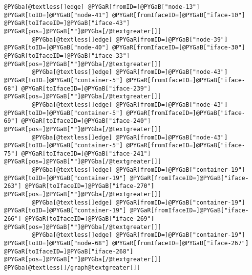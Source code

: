 \documentclass[a4wide,10pt,italian]{manual}
\begin{document}
\begin{Verbatim}[commandchars=@\[\]]
        @PYGba[@textless[]edge] @PYGaR[fromID=]@PYGaB["node-13"] @PYGaR[toID=]@PYGaB["node-41"] @PYGaR[fromIfaceID=]@PYGaB["iface-10"] @PYGaR[toIfaceID=]@PYGaB["iface-43"] @PYGaR[pos=]@PYGaB[""]@PYGba[/@textgreater[]]
        @PYGba[@textless[]edge] @PYGaR[fromID=]@PYGaB["node-39"] @PYGaR[toID=]@PYGaB["node-40"] @PYGaR[fromIfaceID=]@PYGaB["iface-30"] @PYGaR[toIfaceID=]@PYGaB["iface-33"] @PYGaR[pos=]@PYGaB[""]@PYGba[/@textgreater[]]
        @PYGba[@textless[]edge] @PYGaR[fromID=]@PYGaB["node-43"] @PYGaR[toID=]@PYGaB["container-5"] @PYGaR[fromIfaceID=]@PYGaB["iface-68"] @PYGaR[toIfaceID=]@PYGaB["iface-239"] @PYGaR[pos=]@PYGaB[""]@PYGba[/@textgreater[]]
        @PYGba[@textless[]edge] @PYGaR[fromID=]@PYGaB["node-43"] @PYGaR[toID=]@PYGaB["container-5"] @PYGaR[fromIfaceID=]@PYGaB["iface-69"] @PYGaR[toIfaceID=]@PYGaB["iface-240"] @PYGaR[pos=]@PYGaB[""]@PYGba[/@textgreater[]]
        @PYGba[@textless[]edge] @PYGaR[fromID=]@PYGaB["node-43"] @PYGaR[toID=]@PYGaB["container-5"] @PYGaR[fromIfaceID=]@PYGaB["iface-75"] @PYGaR[toIfaceID=]@PYGaB["iface-241"] @PYGaR[pos=]@PYGaB[""]@PYGba[/@textgreater[]]
        @PYGba[@textless[]edge] @PYGaR[fromID=]@PYGaB["container-19"] @PYGaR[toID=]@PYGaB["container-19"] @PYGaR[fromIfaceID=]@PYGaB["iface-263"] @PYGaR[toIfaceID=]@PYGaB["iface-270"] @PYGaR[pos=]@PYGaB[""]@PYGba[/@textgreater[]]
        @PYGba[@textless[]edge] @PYGaR[fromID=]@PYGaB["container-19"] @PYGaR[toID=]@PYGaB["container-19"] @PYGaR[fromIfaceID=]@PYGaB["iface-266"] @PYGaR[toIfaceID=]@PYGaB["iface-269"] @PYGaR[pos=]@PYGaB[""]@PYGba[/@textgreater[]]
        @PYGba[@textless[]edge] @PYGaR[fromID=]@PYGaB["container-19"] @PYGaR[toID=]@PYGaB["node-68"] @PYGaR[fromIfaceID=]@PYGaB["iface-267"] @PYGaR[toIfaceID=]@PYGaB["iface-268"] @PYGaR[pos=]@PYGaB[""]@PYGba[/@textgreater[]]
@PYGba[@textless[]/graph@textgreater[]]
\end{Verbatim}
\end{document}
